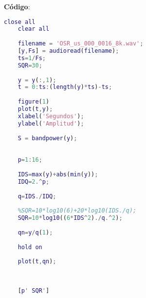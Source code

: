 
\textbf{Código}:
\begin{lstlisting}[language=Matlab]
	close all 
	clear all
	
	filename = 'OSR_us_000_0016_8k.wav';
	[y,Fs] = audioread(filename);
	ts=1/Fs;
	SQR=30;
	
	y = y(:,1);
	t = 0:ts:(length(y)*ts)-ts;
	
	figure(1)
	plot(t,y); 
	xlabel('Segundos'); 
	ylabel('Amplitud');
	
	S = bandpower(y);
	
	
	p=1:16;
	
	IDS=max(y)+abs(min(y));
	IDQ=2.^p;
	
	q=IDS./IDQ;
	
	%SQR=10*log10(6)+20*log10(IDS./q);
	SQR=10*log10((6*IDS^2)./q.^2);
	
	qn=y/q(1);
	
	hold on
	
	plot(t,qn); 
	
	
	
	[p' SQR']
	

\end{lstlisting}

 \begin{figure}[!htbp]
 	\centering
	\\
\end{figure}
